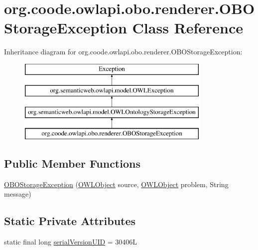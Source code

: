 \hypertarget{classorg_1_1coode_1_1owlapi_1_1obo_1_1renderer_1_1_o_b_o_storage_exception}{\section{org.\-coode.\-owlapi.\-obo.\-renderer.\-O\-B\-O\-Storage\-Exception Class Reference}
\label{classorg_1_1coode_1_1owlapi_1_1obo_1_1renderer_1_1_o_b_o_storage_exception}
}
Inheritance diagram for org.\-coode.\-owlapi.\-obo.\-renderer.\-O\-B\-O\-Storage\-Exception\-:\begin{figure}[H]
\begin{center}
\leavevmode
\includegraphics[height=4.000000cm]{classorg_1_1coode_1_1owlapi_1_1obo_1_1renderer_1_1_o_b_o_storage_exception}
\end{center}
\end{figure}
\subsection*{Public Member Functions}
\begin{DoxyCompactItemize}
\item 
\hyperlink{classorg_1_1coode_1_1owlapi_1_1obo_1_1renderer_1_1_o_b_o_storage_exception_a95616b0e1f347056df323116cc4332d8}{O\-B\-O\-Storage\-Exception} (\hyperlink{interfaceorg_1_1semanticweb_1_1owlapi_1_1model_1_1_o_w_l_object}{O\-W\-L\-Object} source, \hyperlink{interfaceorg_1_1semanticweb_1_1owlapi_1_1model_1_1_o_w_l_object}{O\-W\-L\-Object} problem, String message)
\end{DoxyCompactItemize}
\subsection*{Static Private Attributes}
\begin{DoxyCompactItemize}
\item 
static final long \hyperlink{classorg_1_1coode_1_1owlapi_1_1obo_1_1renderer_1_1_o_b_o_storage_exception_a93e53e1d7ae1edb42e60b358ed6288b7}{serial\-Version\-U\-I\-D} = 30406\-L
\end{DoxyCompactItemize}
